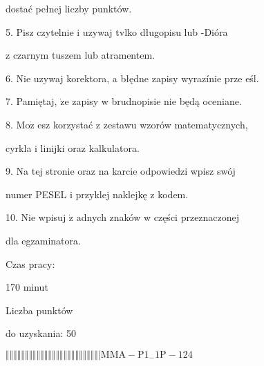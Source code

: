 \documentclass[a4paper,12pt]{article}
\begin{document}
dostać pełnej liczby punktów.

5. Pisz czytelnie i uzywaj tvlko długopisu lub -Dióra

z czarnym tuszem lub atramentem.

6. Nie uzywaj korektora, a błędne zapisy wyrazínie prze eśl.

7. Pamiętaj, $\dot{\mathrm{z}}\mathrm{e}$ zapisy w brudnopisie nie będą oceniane.

8. $\mathrm{M}\mathrm{o}\dot{\mathrm{z}}$ esz korzystać z zestawu wzorów matematycznych,

cyrkla i linijki oraz kalkulatora.

9. Na tej stronie oraz na karcie odpowiedzi wpisz swój

numer PESEL i przyklej naklejkę z kodem.

10. Nie wpisuj $\dot{\mathrm{z}}$ adnych znaków w części przeznaczonej

dla egzaminatora.

Czas pracy:

170 minut

Liczba punktów

do uzyskania: 50

$\Vert\Vert\Vert\Vert\Vert\Vert\Vert\Vert\Vert\Vert\Vert\Vert\Vert\Vert\Vert\Vert\Vert\Vert\Vert\Vert\Vert\Vert\Vert\Vert|  \mathrm{M}\mathrm{M}\mathrm{A}-\mathrm{P}1_{-}1\mathrm{P}-124$
\end{document}
